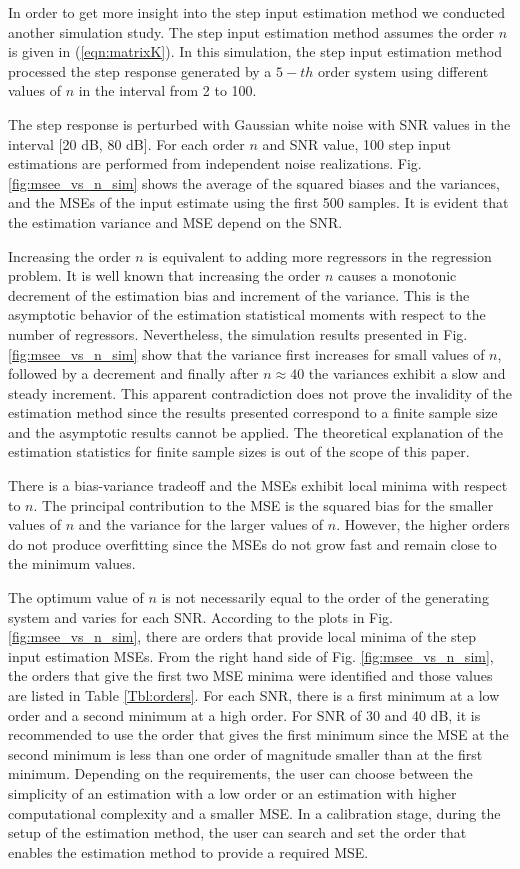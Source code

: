 In order to get more insight into the step input estimation method we conducted another simulation study. 
The step input estimation method assumes the order $n$ is given in (\ref{eqn:matrixK}).
In this simulation, the step input estimation method processed the step response generated by a $5-th$ order system using different values of $n$ in the interval from 2 to 100.

The step response is perturbed with Gaussian white noise with SNR values in the interval [20 dB, 80 dB].
For each order $n$ and SNR value, 100 step input estimations are performed from independent noise realizations. 
Fig. \ref{fig:msee_vs_n_sim} shows the average of the squared biases and the variances, and the MSEs of the input estimate using the first 500 samples.
It is evident that the estimation variance and MSE depend on the SNR.

Increasing the order $n$ is equivalent to adding more regressors in the regression problem.
It is well known that increasing the order $n$ causes a monotonic decrement of the estimation bias and increment of the variance.
This is the asymptotic behavior of the estimation statistical moments with respect to the number of regressors.
Nevertheless, the simulation results presented in Fig. \ref{fig:msee_vs_n_sim} show that the variance first increases for small values of $n$, followed by a decrement and finally after $n \approx 40$ the variances exhibit a slow and steady increment. 
This apparent contradiction does not prove the invalidity of the estimation method since the results presented correspond to a finite sample size and the asymptotic results cannot be applied.
The theoretical explanation of the estimation statistics for finite sample sizes is out of the scope of this paper.

 
There is a bias-variance tradeoff and the MSEs exhibit local minima with respect to $n$.
The principal contribution to the MSE is the squared bias for the smaller values of $n$ and the variance for the larger values of $n$. 
However, the higher orders do not produce overfitting since the MSEs do not grow fast and remain close to the minimum values. 

The optimum value of $n$ is not necessarily equal to the order of the generating system and varies for each SNR.
According to the plots in Fig. \ref{fig:msee_vs_n_sim}, there are orders that provide local minima of the step input estimation MSEs.
From the right hand side of Fig. \ref{fig:msee_vs_n_sim}, the orders that give the first two MSE minima were identified and those values are listed in Table \ref{Tbl:orders}.
For each SNR, there is a first minimum at a low order and a second minimum at a high order.
For SNR of 30 and 40 dB, it is recommended to use the order that gives the first minimum since the MSE at the second minimum is less than one order of magnitude smaller than at the first minimum.
Depending on the requirements, the user can choose between the simplicity of an estimation with a low order or an estimation with higher computational complexity and a smaller MSE. 
In a calibration stage, during the setup of the estimation method, the user can search and set the order that enables the estimation method to provide a required MSE.



